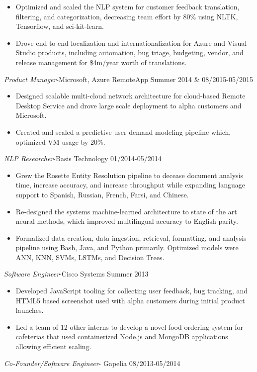 \documentclass[line,margin]{res}
\begin{document}
\begin{resume}
\begin{itemize}
\item Optimized and scaled the NLP system for customer feedback translation, filtering, and categorization, decreasing team effort by $80\%$ using NLTK, Tensorflow, and sci-kit-learn.
\item Drove end to end localization and internationalization for Azure and Visual Studio products, including automation, bug triage, budgeting, vendor, and release management for \$4m/year worth of translations.
\end{itemize}
{\sl Product Manager}-Microsoft, Azure RemoteApp  \hfill Summer 2014 \& 08/2015-05/2015
\begin{itemize}  \itemsep -4pt
\item Designed scalable multi-cloud network architecture for cloud-based Remote Desktop Service and drove large scale deployment to alpha customers and Microsoft.
\item Created and scaled a predictive user demand modeling pipeline which, optimized VM usage by 20\%.
\end{itemize}
{\sl NLP Researcher}-Basis Technology \hfill 01/2014-05/2014
\begin{itemize}  \itemsep -4pt
\item Grew the Rosette Entity Resolution pipeline to decease document analysis time, increase accuracy, and increase throughput while expanding language support to Spanish, Russian, French, Farsi, and Chinese.
\item Re-designed the systems machine-learned architecture to state of the art neural methods, which improved multilingual accuracy to English parity.
\item Formalized data creation, data ingestion, retrieval, formatting, and analysis pipeline using Bash, Java, and Python primarily. Optimized models were ANN, KNN, SVMs, LSTMs, and Decision Trees.
\end{itemize}
{\sl Software Engineer}-Cisco Systems \hfill Summer 2013
\begin{itemize}  \itemsep -4pt
\item Developed JavaScript tooling for collecting user feedback, bug tracking, and HTML5 based screenshot used with alpha customers during initial product launches. 
\item Led a team of 12 other interns to develop a novel food ordering system for cafeterias that used containerized Node.js and MongoDB applications allowing efficient scaling.
\end{itemize}
{\sl Co-Founder/Software Engineer}- Gapelia \hfill 08/2013-05/2014

\end{resume}
\end{document}
